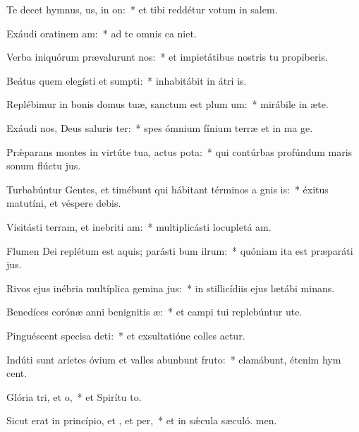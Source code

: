 \item Te decet hymnus, us, in on:~* et tibi reddétur votum in salem.
\item Exáudi oratinem am:~* ad te omnis ca niet.
\item Verba iniquórum prævalurunt  nos:~* et impietátibus nostris tu propiberis.
\item Beátus quem elegísti et sumpti:~* inhabitábit in átri is.
\item Replébimur in bonis domus tuæ, sanctum est plum um:~* mirábile in æte.
\item Exáudi nos, Deus saluris ter:~* spes ómnium fínium terræ et in ma ge.
\item Prǽparans montes in virtúte tua, actus pota:~* qui contúrbas profúndum maris sonum flúctu jus.
\item Turbabúntur Gentes, et timébunt qui hábitant términos a gnis is:~* éxitus matutíni, et véspere debis.
\item Visitásti terram, et inebriti am:~* multiplicásti locupletá am.
\item Flumen Dei replétum est aquis; parásti bum ilrum:~* quóniam ita est præparáti jus.
\item Rivos ejus inébria multíplica gemina jus:~* in stillicídiis ejus lætábi minans.
\item Benedíces corónæ anni benignitis æ:~* et campi tui replebúntur ute.
\item Pinguéscent specisa deti:~* et exsultatióne colles actur.
\item Indúti sunt aríetes óvium et valles abunbunt fruto:~* clamábunt, étenim hym cent.
\item Glória tri, et o,~* et Spirítu to.
\item Sicut erat in princípio, et , et per,~* et in sǽcula sæculó. men.
